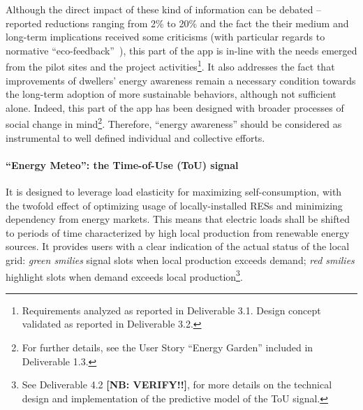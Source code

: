 Although the direct impact of these kind of information can be debated -- reported reductions ranging from 2\% to 20\% \citep{eea_report} and the fact the their medium and
long-term implications received some criticisms (with particular regards to normative ``eco-feedback''~\citep{Strengers2012,Cakici2014}), this part of the app is in-line with the needs emerged from
the pilot sites and the project activities\footnote{Requirements analyzed as reported in Deliverable 3.1. Design concept validated as reported in Deliverable 3.2.}.
It also addresses the fact that improvements of dwellers' energy awareness remain a necessary condition towards the long-term adoption of more sustainable behaviors,
although not sufficient alone. Indeed, this part of the app has been designed with broader processes of social change
in mind\footnote{For further details, see the User Story ``Energy Garden'' included in Deliverable 1.3.}. Therefore, ``energy awareness'' should be considered as instrumental to
well defined individual and collective efforts. 


\paragraph{``Energy Meteo'': the Time-of-Use (ToU) signal} 
It is designed to leverage load elasticity for maximizing self-consumption, with the twofold effect of optimizing usage of locally-installed RESs and minimizing dependency from energy markets. This means that electric loads shall be shifted to periods of time characterized by high local production from renewable energy sources.
It provides users with a clear indication of the actual status of the local grid: \textit{green smilies} signal slots when local production exceeds demand; \textit{red smilies} highlight slots
when demand exceeds local production\footnote{See Deliverable 4.2 \textbf{[NB: VERIFY!!]}, for more details on the technical design and implementation of the predictive model of the ToU signal.}.

